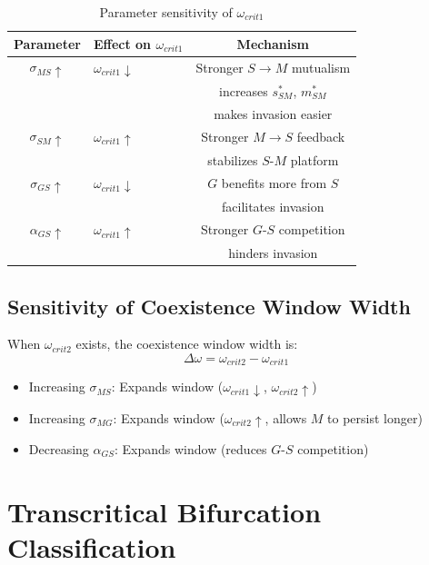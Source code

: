 \documentclass[11pt]{article}
\begin{document}
\begin{table}[h]
\centering
\begin{tabular}{clc}
\toprule
\textbf{Parameter} & \textbf{Effect on $\omega_{crit1}$} & \textbf{Mechanism} \\
\midrule
$\sigma_{MS} \uparrow$ & $\omega_{crit1} \downarrow$ & Stronger $S \to M$ mutualism \\
& & increases $s^*_{SM}$, $m^*_{SM}$ \\
& & makes invasion easier \\[0.5em]
$\sigma_{SM} \uparrow$ & $\omega_{crit1} \uparrow$ & Stronger $M \to S$ feedback \\
& & stabilizes $S$-$M$ platform \\[0.5em]
$\sigma_{GS} \uparrow$ & $\omega_{crit1} \downarrow$ & $G$ benefits more from $S$ \\
& & facilitates invasion \\[0.5em]
$\alpha_{GS} \uparrow$ & $\omega_{crit1} \uparrow$ & Stronger $G$-$S$ competition \\
& & hinders invasion \\
\bottomrule
\end{tabular}
\caption{Parameter sensitivity of $\omega_{crit1}$}
\end{table}

\subsection{Sensitivity of Coexistence Window Width}

When $\omega_{crit2}$ exists, the coexistence window width is:
\begin{equation}
\Delta\omega = \omega_{crit2} - \omega_{crit1}
\end{equation}

\begin{itemize}
    \item Increasing $\sigma_{MS}$: Expands window ($\omega_{crit1} \downarrow$, $\omega_{crit2} \uparrow$)
    \item Increasing $\sigma_{MG}$: Expands window ($\omega_{crit2} \uparrow$, allows $M$ to persist longer)
    \item Decreasing $\alpha_{GS}$: Expands window (reduces $G$-$S$ competition)
\end{itemize}

\section{Transcritical Bifurcation Classification}
\end{document}
